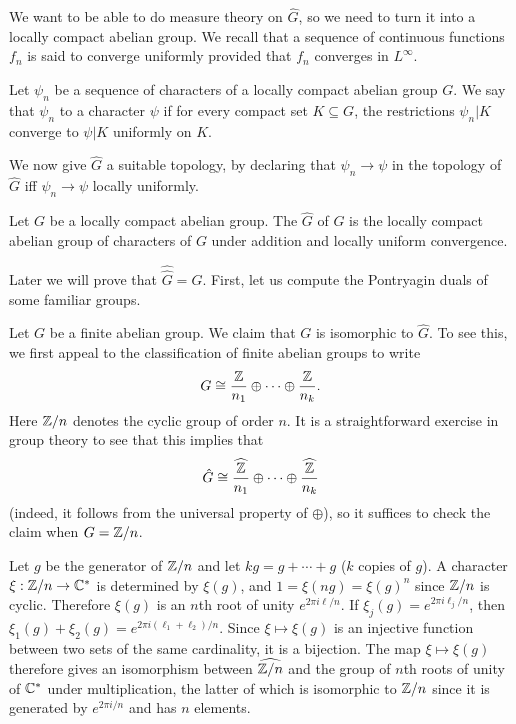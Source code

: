 We want to be able to do measure theory on $\hat G$, so we need to turn it into a locally compact abelian group.
We recall that a sequence of continuous functions $f_{n}$ is said to converge uniformly provided that $f_{n}$ converges in $L^\infty$.
\begin{definition}
Let $\psi_{n}$ be a sequence of characters of a locally compact abelian group $G$.
We say that $\psi_{n}$  to a character $\psi$ if for every compact set $K \subseteq G$, the restrictions $\psi_{n}|K$ converge to $\psi|K$ uniformly on $K$.
\end{definition}
We now give $\hat G$ a suitable topology, by declaring that $\psi_{n} \to \psi$ in the topology of $\hat G$ iff $\psi_{n} \to \psi$ locally uniformly.

\begin{definition}
Let $G$ be a locally compact abelian group.
The  $\hat G$ of $G$ is the locally compact abelian group of characters of $G$ under addition and locally uniform convergence.
\end{definition}

Later we will prove that $\widehat{\hat G} = G$. First, let us compute the Pontryagin duals of some familiar groups.

\begin{example}
Let $G$ be a finite abelian group. We claim that $G$ is isomorphic to $\hat G$. To see this, we first appeal to the classification of finite abelian groups to write
\[G \cong \frac{\mathbb{Z}}{n_1} \oplus \cdots \oplus \frac{\mathbb{Z}}{n_{k}}.\]
Here $\mathbb{Z}/n$ denotes the cyclic group of order $n$.
It is a straightforward exercise in group theory to see that this implies that
\[\hat G \cong \widehat{\frac{\mathbb{Z}}{n_1}} \oplus \cdots \oplus \widehat{\frac{\mathbb{Z}}{n_{k}}}\]
(indeed, it follows from the universal property of $\oplus$), so it suffices to check the claim when $G = \mathbb{Z}/n$.

Let $g$ be the generator of $\mathbb{Z}/n$ and let $kg = g + \cdots + g$ ($k$ copies of $g$).
A character $\xi: \mathbb{Z}/n \to \mathbb{C}^*$ is determined by $\xi(g)$, and $1 = \xi(ng) = \xi(g)^n$ since $\mathbb{Z}/n$ is cyclic.
Therefore $\xi(g)$ is an $n$th root of unity $e^{2\pi i\ell/n}$.
If $\xi_{j}(g) = e^{2\pi i \ell_{j}/n}$, then $\xi_1(g) + \xi_2(g) = e^{2\pi i(\ell_1 + \ell_2)/n}$.
Since $\xi \mapsto \xi(g)$ is an injective function between two sets of the same cardinality, it is a bijection.
The map $\xi \mapsto \xi(g)$ therefore gives an isomorphism between $\widehat{\mathbb{Z}/n}$ and the group of $n$th roots of unity of $\mathbb{C}^*$ under multiplication, the latter of which is isomorphic to $\mathbb{Z}/n$ since it is generated by $e^{2\pi i/n}$ and has $n$ elements.
\end{example}

